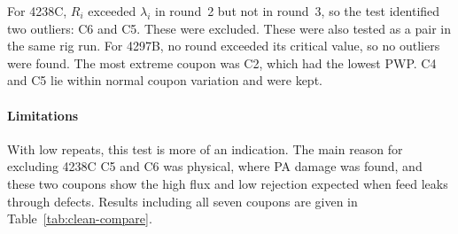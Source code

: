 For 4238C, $R_i$ exceeded $\lambda_i$ in round~2 but not in round~3, so the test identified two outliers: C6 and C5. These were excluded. These were also tested as a pair in the same rig run. For 4297B, no round exceeded its critical value, so no outliers were found. The most extreme coupon was C2, which had the lowest PWP. C4 and C5 lie within normal coupon variation and were kept. 

\paragraph{Limitations}
With low repeats, this test is more of an indication. The main reason for excluding 4238C C5 and C6 was physical, where PA damage was found, and these two coupons show the high flux and low rejection expected when feed leaks through defects. Results including all seven coupons are given in Table~\ref{tab:clean-compare}.
